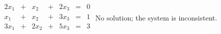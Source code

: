 {$\begin{array}{KQKQJQJ}
2x_1&+&x_2&+&2x_3&=&0\\
x_1&+&x_2&+&3x_3&=&1\\
3x_1&+&2x_2&+&5x_3&=&3\\
\end{array}$}
{No solution; the system is inconsistent.}
